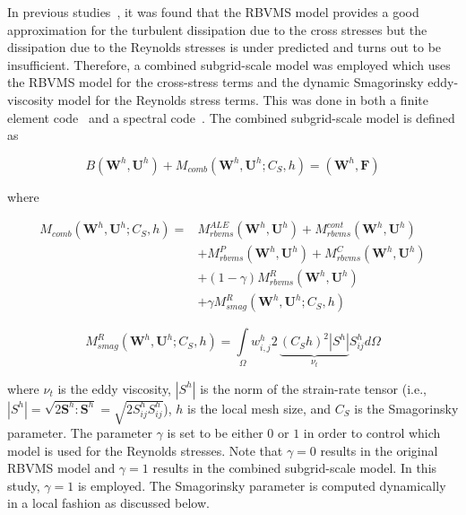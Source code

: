 In previous studies~\cite{bib:wang2010,bib:tran2017a}, it was found that the RBVMS model provides a good
approximation for the turbulent dissipation due to the cross stresses but the
dissipation due to the Reynolds stresses is under predicted and turns out to be
insufficient. Therefore, a combined subgrid-scale model was employed which
uses the RBVMS model for the cross-stress terms
and the dynamic Smagorinsky eddy-viscosity model for the Reynolds stress terms.
This was done in both 
a finite element code~\cite{bib:tran2016,bib:tran2017a}
and a spectral code~\cite{bib:wang2010}.
The combined subgrid-scale model is defined as

\begin{equation}
\label{eq:NS_comb}
 B(\bm{W}^h,\bm{U}^h) + M_{comb}(\bm{W}^h,\bm{U}^h; C_S, h)  = (\bm{W}^h,\bm{F})
\end{equation}

\noindent where

\begin{equation}
\label{eq:NS_Mcomb}
\begin{split}
M_{comb}(\bm{W}^h,\bm{U}^h; C_S, h) =& M^{ALE}_{rbvms}(\bm{W}^h,\bm{U}^h) +M^{cont}_{rbvms}(\bm{W}^h, \bm{U}^h) \\
& + M^P_{rbvms}(\bm{W}^h, \bm{U}^h) + M^C_{rbvms}(\bm{W}^h, \bm{U}^h) \\
& + (1-\gamma) M^R_{rbvms}(\bm{W}^h, \bm{U}^h)
\\
& +\gamma M^R_{smag}(\bm{W}^h,\bm{U}^h; C_S, h)
\end{split}
\end{equation}

\begin{equation}
\label{eq:NS_Smag_sub}
M^R_{smag}(\bm{W}^h,\bm{U}^h; C_S, h) = \int\limits_\Omega w^h_{i,j} 2 \, \underbrace{(C_S h)^2 |S^h|}_{\nu_t} S^h_{ij} d\Omega
\end{equation}

\noindent where $\nu_t$ is the eddy viscosity, $|S^h|$ is the norm of the
strain-rate tensor (i.e., $|S^h|=\sqrt{2 \bm{S}^h : \bm{S}^h} = \sqrt{2 S^h_{ij} S^h_{ij}}$),
$h$ is the local mesh size,
and $C_S$ is the Smagorinsky parameter.
The parameter $\gamma$ is set to be either $0$ or $1$ in order to control
which model is used for the Reynolds stresses.
Note that $\gamma=0$ results in the
original RBVMS model and $\gamma=1$ results in the combined subgrid-scale model.
In this study, $\gamma=1$ is employed.
The Smagorinsky parameter is computed dynamically in a local fashion as discussed below.
